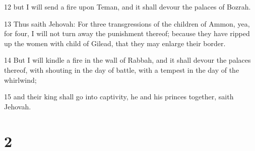 \par 12 but I will send a fire upon Teman, and it shall devour the palaces of Bozrah.
\par 13 Thus saith Jehovah: For three transgressions of the children of Ammon, yea, for four, I will not turn away the punishment thereof; because they have ripped up the women with child of Gilead, that they may enlarge their border.
\par 14 But I will kindle a fire in the wall of Rabbah, and it shall devour the palaces thereof, with shouting in the day of battle, with a tempest in the day of the whirlwind;
\par 15 and their king shall go into captivity, he and his princes together, saith Jehovah.

\chapter{2}


